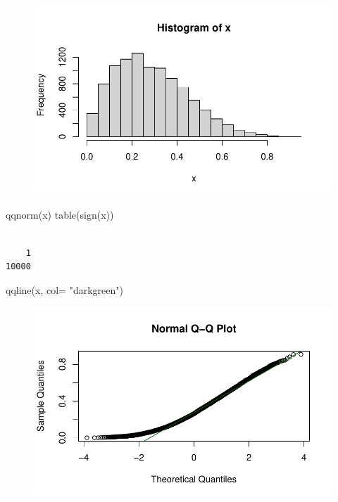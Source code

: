 \documentclass[
  letterpaper,
  DIV=11,
  numbers=noendperiod]{scrreprt}
\newenvironment{Shaded}{\begin{snugshade}}{\end{snugshade}}
\newcommand{\AttributeTok}[1]{\textcolor[rgb]{0.40,0.45,0.13}{#1}}
\newcommand{\FunctionTok}[1]{\textcolor[rgb]{0.28,0.35,0.67}{#1}}
\newcommand{\NormalTok}[1]{\textcolor[rgb]{0.00,0.23,0.31}{#1}}
\newcommand{\StringTok}[1]{\textcolor[rgb]{0.13,0.47,0.30}{#1}}
\begin{document}
\begin{figure}[H]

{\centering \includegraphics{methods_files/figure-pdf/unnamed-chunk-3-1.pdf}

}

\end{figure}

\begin{Shaded}
\begin{Highlighting}[]
\FunctionTok{qqnorm}\NormalTok{(x)}
\FunctionTok{table}\NormalTok{(}\FunctionTok{sign}\NormalTok{(x))}
\end{Highlighting}
\end{Shaded}

\begin{verbatim}

    1 
10000 
\end{verbatim}

\begin{Shaded}
\begin{Highlighting}[]
\FunctionTok{qqline}\NormalTok{(x, }\AttributeTok{col=} \StringTok{"darkgreen"}\NormalTok{)}
\end{Highlighting}
\end{Shaded}

\begin{figure}[H]

{\centering \includegraphics{methods_files/figure-pdf/unnamed-chunk-3-2.pdf}

}

\end{figure}
\end{document}
